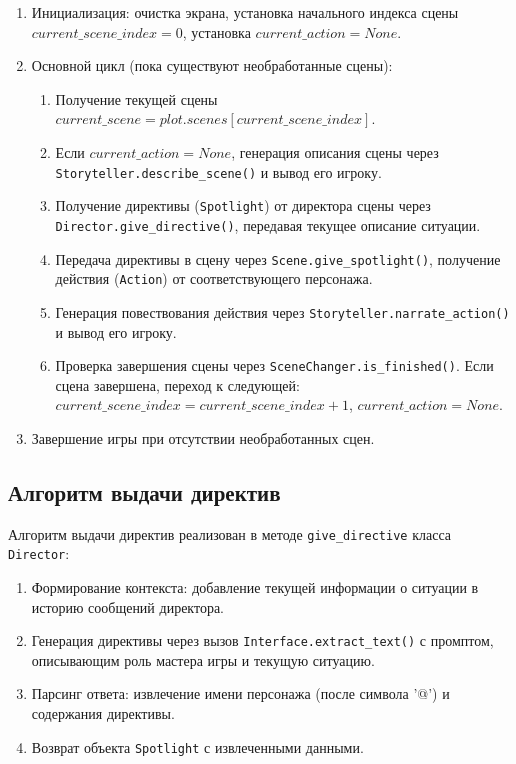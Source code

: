 \begin{enumerate}
	\item Инициализация: очистка экрана, установка начального индекса сцены $current\_scene\_index = 0$, установка $current\_action = None$.
	
	\item Основной цикл (пока существуют необработанные сцены):
	\begin{enumerate}
		\item Получение текущей сцены $current\_scene = plot.scenes[current\_scene\_index]$.
		
		\item Если $current\_action = None$, генерация описания сцены через \texttt{Storyteller.describe\_scene()} и вывод его игроку.
		
		\item Получение директивы (\texttt{Spotlight}) от директора сцены через \texttt{Director.give\_directive()}, передавая текущее описание ситуации.
		
		\item Передача директивы в сцену через \texttt{Scene.give\_spotlight()}, получение действия (\texttt{Action}) от соответствующего персонажа.
		
		\item Генерация повествования действия через \texttt{Storyteller.narrate\_action()} и вывод его игроку.
		
		\item Проверка завершения сцены через \texttt{SceneChanger.is\_finished()}. Если сцена завершена, переход к следующей: $current\_scene\_index = current\_scene\_index + 1$, $current\_action = None$.
	\end{enumerate}
	
	\item Завершение игры при отсутствии необработанных сцен.
\end{enumerate}

\subsection{Алгоритм выдачи директив}

Алгоритм выдачи директив реализован в методе \texttt{give\_directive} класса \texttt{Director}:

\begin{enumerate}
	\item Формирование контекста: добавление текущей информации о ситуации в историю сообщений директора.
	
	\item Генерация директивы через вызов \texttt{Interface.extract\_text()} с промптом, описывающим роль мастера игры и текущую ситуацию.
	
	\item Парсинг ответа: извлечение имени персонажа (после символа '@') и содержания директивы.
	
	\item Возврат объекта \texttt{Spotlight} с извлеченными данными.
\end{enumerate}

